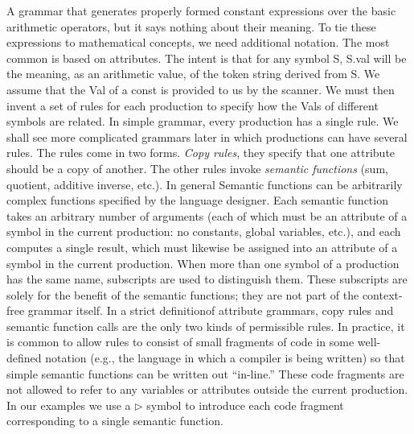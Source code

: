 \documentclass[a4paper,12pt]{article}
\begin{document}
A grammar that generates properly formed constant expressions over the basic arithmetic operators, but it says nothing about their meaning. To tie these expressions to mathematical concepts, we need additional notation. The most common is based on attributes. The intent is that for any symbol S, S.val will be the meaning, as an arithmetic value, of the token string derived from S. We assume that the Val of a const is provided to us by the scanner. We must then invent a set of rules for each production to specify how the Vals of different symbols are related. In simple grammar, every production has a single rule. We shall see more complicated grammars later in which productions can have several rules. The rules come in two forms. \textit{Copy rules}, they specify that one attribute should be a copy of another. The other rules invoke \textit{semantic functions} (sum, quotient, additive inverse, etc.). In general Semantic functions can be arbitrarily complex functions specified by the language designer. Each semantic function takes an arbitrary number of arguments (each of which must be an attribute of a symbol in the current production: no constants, global variables,
etc.), and each computes a single result, which must likewise be assigned into an attribute of a symbol in the current production. When more than one symbol of a production has the same name, subscripts are used to distinguish them. These subscripts are solely for the benefit of the semantic functions; they are not part of the context-free grammar itself.
In a strict definitionof attribute grammars, copy rules and semantic function calls are the only two kinds of permissible rules. In practice, it is common to allow rules to consist of small fragments of code in some well-defined notation (e.g., the language in which a compiler is being written) so that simple semantic functions can be written out ``in-line.'' These code fragments are not allowed to refer to any variables or attributes outside the current production. In our examples we use a $\triangleright$    symbol to introduce each code fragment corresponding to a single semantic function.
\end{document}
